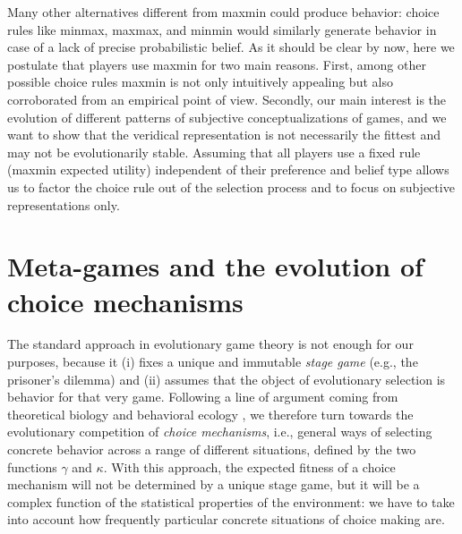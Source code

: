 \documentclass[fleqn,reqno,11pt]{article}
\begin{document}
Many other alternatives different from maxmin could produce behavior: choice rules like minmax, maxmax, and minmin would similarly generate behavior in case of a lack of precise probabilistic belief. As it should be clear by now, here we postulate that players use maxmin for two main reasons. First, among other possible choice rules maxmin is not only intuitively appealing but also corroborated from an empirical point of view. Secondly, our main interest is the evolution of different patterns of subjective conceptualizations of games, and we want to show that the veridical representation is not necessarily the fittest and may not be evolutionarily stable. Assuming that all players use a fixed rule (maxmin expected utility) independent of their preference and belief type allows us to factor the choice rule out of the selection process and to focus on subjective representations only.




\iffalse

\begin{fact} \label{fact:maxEU-minReg}

For any probability measure $\mu$, maximization of expected utility and minimization of expected regret are behaviorally equivalent.

\end{fact}

\noindent As we have seen in the previous example, this is not the case in the presence of (radical) uncertainty, in the sense of representation of belief state in terms of a set of probability, as in $ \Delta $.
\fi





\section{Meta-games and the evolution of choice mechanisms}
\label{sec:model}

The standard approach in
evolutionary game theory is not enough for our purposes, because it (i) fixes a unique and immutable
\emph{stage game} (e.g., the prisoner's dilemma) and (ii) assumes that the object of
evolutionary selection is behavior for that very game. Following a line of argument coming from theoretical biology and behavioral ecology
\citep[e.g.,][]{FawcettHamblin2013:Exposing-the-be}, we therefore turn towards the evolutionary
competition of \emph{choice mechanisms}, i.e., general ways of selecting concrete behavior
across a range of different situations, defined by the two functions $\gamma$ and $\kappa$. With this approach, the expected fitness of a choice
mechanism will not be determined by a unique stage game, but it will be a
complex function of the statistical properties of the environment: we have to take into account
how frequently particular concrete situations of choice making are.
\end{document}
